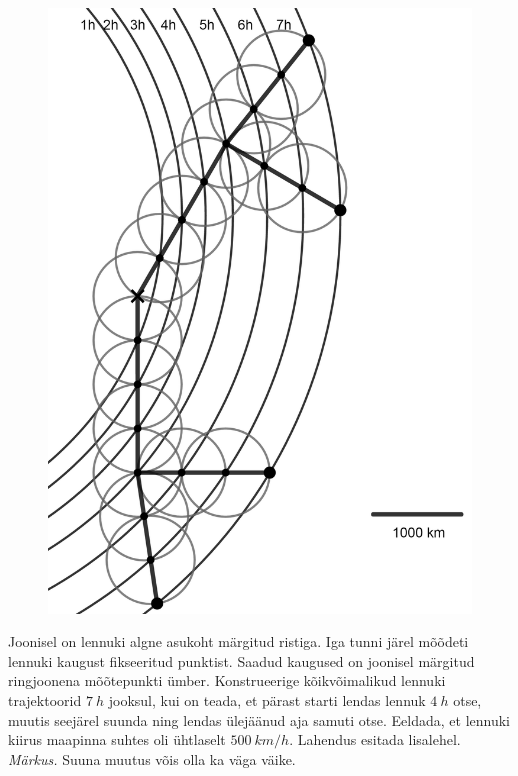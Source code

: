 \setAuthor{}

\begin{figure}
  \vspace{-28pt}
  \begin{center}
  \includegraphics[scale=0.2]{2019-v3g-03-yl.png}
  \end{center}
  \vspace{-20pt}
\end{figure}


Joonisel on lennuki algne asukoht märgitud ristiga. Iga tunni järel mõõdeti lennuki kaugust fikseeritud punktist. Saadud kaugused on joonisel märgitud ringjoonena mõõtepunkti ümber. Konstrueerige kõikvõimalikud lennuki trajektoorid $\SI{7}{h}$ jooksul, kui on teada, et pärast starti lendas lennuk $\SI{4}{h}$ otse, muutis seejärel suunda ning lendas ülejäänud aja samuti otse. Eeldada, et lennuki kiirus maapinna suhtes oli ühtlaselt $\SI{500}{km/h}$. Lahendus esitada lisalehel.
\textit{Märkus.} Suuna muutus võis olla ka väga väike. 


